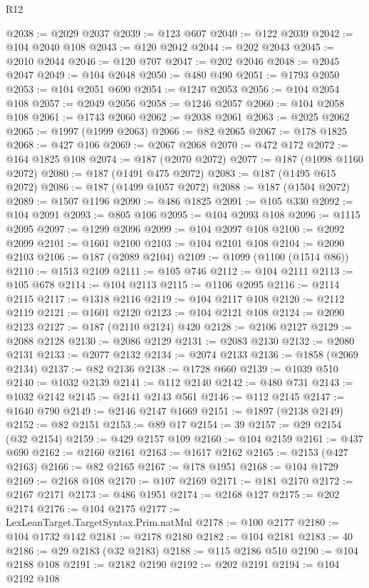 \begin{lexlean}{R12}
\begin{coremodule}
@2038 := @2029 @2037
@2039 := @123 @607
@2040 := @122 @2039
@2042 := @104 @2040 @108
@2043 := @120 @2042
@2044 := @202 @2043
@2045 := @2010 @2044
@2046 := @120 @707
@2047 := @202 @2046
@2048 := @2045 @2047
@2049 := @104 @2048
@2050 := @480 @490
@2051 := @1793 @2050
@2053 := @104 @2051 @690
@2054 := @1247 @2053
@2056 := @104 @2054 @108
@2057 := @2049 @2056
@2058 := @1246 @2057
@2060 := @104 @2058 @108
@2061 := @1743 @2060
@2062 := @2038 @2061
@2063 := @2025 @2062
@2065 := @1997 (@1999 @2063)
@2066 := @82 @2065
@2067 := @178 @1825
@2068 := @427 @106
@2069 := @2067 @2068
@2070 := @472 @172
@2072 := @164 @1825 @108
@2074 := @187 (@2070 @2072)
@2077 := @187 (@1098 @1160 @2072)
@2080 := @187 (@1491 @475 @2072)
@2083 := @187 (@1495 @615 @2072)
@2086 := @187 (@1499 @1057 @2072)
@2088 := @187 (@1504 @2072)
@2089 := @1507 @1196
@2090 := @486 @1825
@2091 := @105 @330
@2092 := @104 @2091
@2093 := @805 @106
@2095 := @104 @2093 @108
@2096 := @1115 @2095
@2097 := @1299 @2096
@2099 := @104 @2097 @108
@2100 := @2092 @2099
@2101 := @1601 @2100
@2103 := @104 @2101 @108
@2104 := @2090 @2103
@2106 := @187 (@2089 @2104)
@2109 := @1099 (@1100 (@1514 @86))
@2110 := @1513 @2109
@2111 := @105 @746
@2112 := @104 @2111
@2113 := @105 @678
@2114 := @104 @2113
@2115 := @1106 @2095
@2116 := @2114 @2115
@2117 := @1318 @2116
@2119 := @104 @2117 @108
@2120 := @2112 @2119
@2121 := @1601 @2120
@2123 := @104 @2121 @108
@2124 := @2090 @2123
@2127 := @187 (@2110 @2124) @420
@2128 := @2106 @2127
@2129 := @2088 @2128
@2130 := @2086 @2129
@2131 := @2083 @2130
@2132 := @2080 @2131
@2133 := @2077 @2132
@2134 := @2074 @2133
@2136 := @1858 (@2069 @2134)
@2137 := @82 @2136
@2138 := @1728 @660
@2139 := @1039 @510
@2140 := @1032 @2139
@2141 := @112 @2140
@2142 := @480 @731
@2143 := @1032 @2142
@2145 := @2141 @2143 @561
@2146 := @112 @2145
@2147 := @1640 @790
@2149 := @2146 @2147 @1669
@2151 := @1897 (@2138 @2149)
@2152 := @82 @2151
@2153 := @89 @17
@2154 := 39
@2157 := @29 @2154 (@32 @2154)
@2159 := @429 @2157 @109
@2160 := @104 @2159
@2161 := @437 @690
@2162 := @2160 @2161
@2163 := @1617 @2162
@2165 := @2153 (@427 @2163)
@2166 := @82 @2165
@2167 := @178 @1951
@2168 := @104 @1729
@2169 := @2168 @108
@2170 := @107 @2169
@2171 := @181 @2170
@2172 := @2167 @2171
@2173 := @486 @1951
@2174 := @2168 @127
@2175 := @202 @2174
@2176 := @104 @2175
@2177 := LexLeanTarget.TargetSyntax.Prim.natMul
@2178 := @100 @2177
@2180 := @104 @1732 @142
@2181 := @2178 @2180
@2182 := @104 @2181
@2183 := 40
@2186 := @29 @2183 (@32 @2183)
@2188 := @115 @2186 @510
@2190 := @104 @2188 @108
@2191 := @2182 @2190
@2192 := @202 @2191
@2194 := @104 @2192 @108

\end{coremodule}
\end{lexlean}

